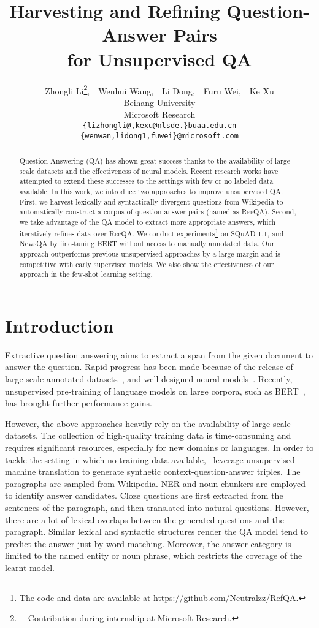 \documentclass[11pt,a4paper]{article}
\title{Harvesting and Refining Question-Answer Pairs \\ for Unsupervised QA}
\author{Zhongli Li\thanks{~~Contribution during internship at Microsoft Research.},~~Wenhui Wang,~~Li Dong,~~Furu Wei,~~Ke Xu \\
  Beihang University \\
  Microsoft Research \\
  \texttt{\{lizhongli@,kexu@nlsde.\}buaa.edu.cn} \\
  \texttt{\{wenwan,lidong1,fuwei\}@microsoft.com}}
\date{}
\newcommand\refqa{\textsc{RefQA}}
\begin{document}
\maketitle
\begin{abstract}
Question Answering (QA) has shown great success thanks to the availability of large-scale datasets and the effectiveness of neural models. Recent research works have attempted to extend these successes to the settings with few or no labeled data available.
In this work, we introduce two approaches to improve unsupervised QA. 
First, we harvest lexically and syntactically divergent questions from Wikipedia to automatically construct a corpus of question-answer pairs (named as \refqa{}).
Second, we take advantage of the QA model to extract more appropriate answers, which iteratively refines data over \refqa{}.
We conduct experiments\footnote{The code and data are available at \url{https://github.com/Neutralzz/RefQA}.} on SQuAD 1.1, and NewsQA by fine-tuning BERT without access to manually annotated data.
Our approach outperforms previous unsupervised approaches by a large margin and is competitive with early supervised models.
We also show the effectiveness of our approach in the few-shot learning setting.
\end{abstract}


\section{Introduction}



Extractive question answering aims to extract a span from the given document to answer the question. 
Rapid progress has been made because of the release of large-scale annotated datasets~\citep{squad1, squad2, triviaqa}, and well-designed neural models~\citep{wang2016matchlstm, bidaf, qanet}. Recently, unsupervised pre-training of language models on large corpora, such as BERT~\citep{BERT}, has brought further performance gains.



However, the above approaches heavily rely on the availability of large-scale datasets. The collection of high-quality training data is time-consuming and requires significant resources, especially for new domains or languages.
In order to tackle the setting in which no training data available,~\citet{lewis2019unsupervisedqa} 
leverage unsupervised machine translation to generate synthetic context-question-answer triples.
The paragraphs are sampled from Wikipedia. NER and noun chunkers are employed to identify answer candidates.
Cloze questions are first extracted from the sentences of the paragraph, and then translated into natural questions. 
However, there are a lot of lexical overlaps between the generated questions and the paragraph. 
Similar lexical and syntactic structures render the QA model tend to predict the answer just by word matching.
Moreover, the answer category is limited to the named entity or noun phrase, which restricts the coverage of the learnt model.
\end{document}
